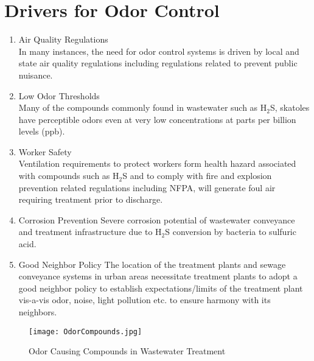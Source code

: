 \section{Drivers for Odor Control}
\begin{enumerate}
\item Air Quality Regulations\\
In many instances, the need for odor control systems is driven by local and state air quality regulations including regulations related to prevent public nuisance.
\item Low Odor Thresholds\\
Many of the compounds commonly found in wastewater such as H$_2$S, skatoles have perceptible odors even at very low concentrations at parts per billion levels (ppb).
\item Worker Safety\\
Ventilation requirements to protect workers form health hazard associated with compounds such as H$_2$S and to comply with fire and explosion prevention related regulations including NFPA, will generate foul air requiring treatment prior to discharge.
\item Corrosion Prevention
Severe corrosion potential of wastewater conveyance and treatment infrastructure due to H$_2$S conversion by bacteria to sulfuric acid.
\item Good Neighbor Policy
The location of the treatment plants and sewage conveyance systems in urban areas necessitate treatment plants to adopt a good neighbor policy to establish expectations/limits of the treatment plant vis-a-vis odor, noise, light pollution etc. to ensure harmony with its neighbors.
\end{enumerate}

\afterpage{\clearpage}
				\begin{sidewaysfigure}[!hp]
					\begin{center}
						\texttt{[image: OdorCompounds.jpg]}\\
						\caption{Odor Causing Compounds in Wastewater Treatment}
					\end{center}
				\end{sidewaysfigure}

